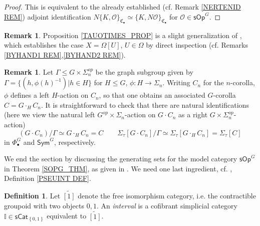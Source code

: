 \documentclass[a4paper,10pt
,draft
]{article}%
\numberwithin{equation}{section}
\numberwithin{figure}{section}
\theoremstyle{definition} %
\newtheorem{definition}[equation]{Definition}%
\newtheorem{remark}[equation]{Remark}%
\newcommand{\set}[1]{\left\{#1\right\}}%
\renewcommand{\O}{\ensuremath{\mathcal O}}
\newcommand{\1}{\ensuremath{\mathbbm 1}}%
\begin{document}
\begin{proof}
	This is equivalent to the 
	already established (cf. Remark \ref{NERTENID REM}) adjoint identification
	$
	N \{K,\O\}_{\mathfrak{C}_{\bullet}}
	\simeq
	\{K,N \O\}_{\mathfrak{C}_{\bullet}} 
	$
	for $\O \in \mathsf{sOp}^G$.	
\end{proof}



\begin{remark}
	Proposition \ref{TAUOTIMES_PROP} is a slight generalization of 
	\cite[Prop. 7.2]{CM13b},
	which establishes the case
	$X = \Omega[U]$, $U\in \Omega$
	by direct inspection
	(cf. Remarks \ref{BYHAND1 REM},\ref{BYHAND2 REM}).
\end{remark}



\begin{remark}\label{SIGMATAUQUOT REM}
Let $\Gamma \leq G \times \Sigma_n^{op}$
be the graph subgroup given by
$\Gamma = \{(h,\phi(h)^{-1})|h\in H\}$
for $H\leq G$, $\phi\colon H \to \Sigma_n$.
Writing
$C_{n}$ for the $n$-corolla, 
$\phi$ defines a left $H$-action on $C_{n}$,
so that one obtains an associated
$G$-corolla $C = G \cdot_{H} C_{n}$.
It is straightforward to check that there are natural identifications
(here we view the natural 
left $G^{op}\times \Sigma_n$-action on 
$G \cdot C_{n}$ as a 
right $G\times \Sigma_n^{op}$-action)
\begin{equation}\label{SIGMATAUQUOT EQ}
	(G \cdot C_{n})/\Gamma
\simeq
	G \cdot_H C_{n}
= 
	C
\qquad
	\Sigma_{\tau}[G \cdot C_{n}]/\Gamma
\simeq
	\Sigma_{\tau}[G \cdot_H C_{n}]
= 
	\Sigma_{\tau}[C]
\end{equation}
in $\Phi^G_{\bullet}$ and $\mathsf{Sym}^G$, respectively.
\end{remark}


We end the section by discussing the generating sets
for the model category $\mathsf{sOp}^G$ in Theorem \ref{SOPG_THM},
as given in \cite[Def. \ref{AC-OPGENCOF DEF}]{BP_ACOP}.
We need one last ingredient,
cf. \cite[Def. \ref{AC-VINTER DEF}]{BP_ACOP}, Definition \ref{PSEUINT DEF}.


\begin{definition}
	Let $\widetilde{[1]}$ denote the free isomorphism category,
	i.e. the contractible groupoid with two objects $0,1$.
%		
	An \textit{interval} is a cofibrant simplicial category $\mathbb I \in \mathsf{sCat}_{\set{0,1}}$ equivalent to $\widetilde{[1]}$.
\end{definition}
\end{document}
